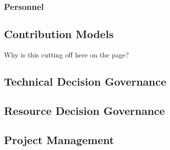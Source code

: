 \subsubsection{Personnel}
\label{ch:exec-comp-gov-res-hum}

\subsection{Contribution Models}	
\label{ch:exec-comp-gov-contrib}
Why is this cutting off here on the page?

\subsection{Technical Decision Governance}	
\label{ch:exec-comp-gov-tech}

\subsection{Resource Decision Governance	}
\label{ch:exec-comp-gov-resdec}

\subsection{Project Management}	
\label{ch:exec-comp-gov-pm}